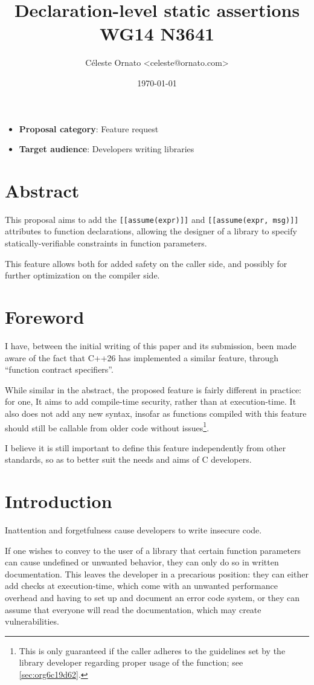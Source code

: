 \documentclass[a4paper, 12pt]{article}
\author{Céleste Ornato <celeste@ornato.com>}
\date{\today}
\title{Declaration-level static assertions\\\medskip
\large WG14 N3641}
\begin{document}
\maketitle
\begin{itemize}
\item \textbf{Proposal category}: Feature request
\item \textbf{Target audience}: Developers writing libraries
\end{itemize}
\section{Abstract}
\label{sec:orge0e6a1c}
This proposal aims to add the \texttt{[[assume(expr)]]} and \texttt{[[assume(expr, msg)]]}
attributes to function declarations, allowing the designer of a library to specify
statically-verifiable constraints in function parameters.

This feature allows both for added safety on the caller side, and possibly for
further optimization on the compiler side.
\section{Foreword}
\label{sec:orga597c69}
I have, between the initial writing of this paper and its submission, been made aware
of the fact that C++26 has implemented a similar feature, through ``function contract
specifiers''.

While similar in the abstract, the proposed feature is fairly different in practice:
for one, It aims to add compile-time security, rather than at execution-time.
It also does not add any new syntax, insofar as functions compiled with this feature
should still be callable from older code without issues\footnote{This is only guaranteed if the caller adheres to the guidelines set by the library
developer regarding proper usage of the function; see \ref{sec:org6c19d62}.}.

I believe it is still important to define this feature independently from other standards,
so as to better suit the needs and aims of C developers.
\section{Introduction}
\label{sec:orga1726cb}
Inattention and forgetfulness cause developers to write insecure code.

If one wishes to convey to the user of a library that certain function parameters
can cause undefined or unwanted behavior, they can only do so in written
documentation.  This leaves the developer in a precarious position: they can
either add checks at execution-time, which come with an unwanted performance
overhead and having to set up and document an error code system,
or they can assume that everyone will read the documentation, which may create
vulnerabilities.
\end{document}
